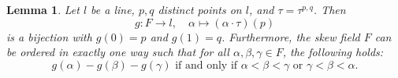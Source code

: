 \documentclass[11pt,a4paper]{article}
\newcommand{\betw}[3]{#1 - #2 - #3}
\newtheorem{lemma}[theorem]{Lemma}
\begin{document}
\begin{lemma} \label{lem:order_on_F}
Let $l$ be a line, $p, q$ distinct points on $l$, and $\tau = \tau^{p,q}$. Then
\begin{equation} \label{eq:bijection_g}
    g: F \to l, \quad \alpha \mapsto (\alpha \cdot \tau)(p)
\end{equation}
is a bijection with $g(0) = p$ and $g(1) = q$. Furthermore, the skew field $F$ can be ordered in exactly one way such that for all $\alpha, \beta, \gamma \in F$, the following holds:
\begin{equation} \label{eq:F_order_equiv}
    \betw{g(\alpha)}{g(\beta)}{g(\gamma)} \text{ if and only if } \alpha < \beta < \gamma \text{ or } \gamma < \beta < \alpha.
\end{equation}
\end{lemma}
\end{document}

